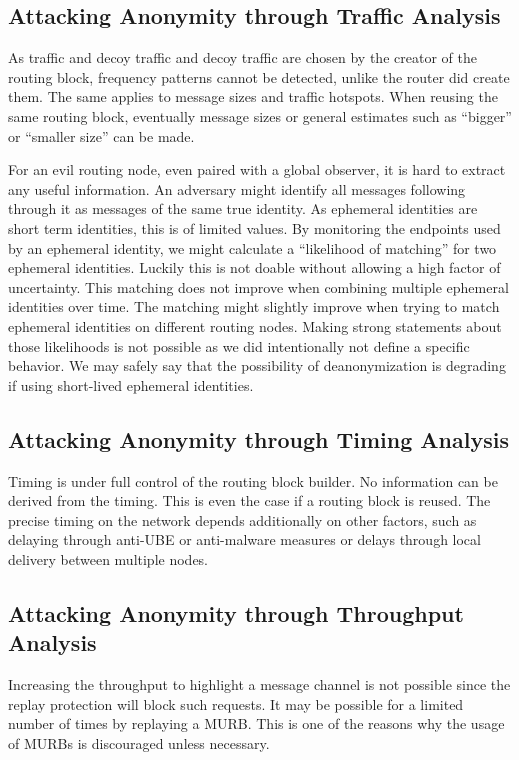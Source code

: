\subsection{Attacking Anonymity through Traffic Analysis}
As traffic and decoy traffic and decoy traffic are chosen by the creator of the routing block, frequency patterns cannot be detected, unlike the router did create them. The same applies to message sizes and traffic hotspots. When reusing the same routing block, eventually message sizes or general estimates such as ``bigger'' or ``smaller size'' can be made.

For an evil routing node, even paired with a global observer, it is hard to extract any useful information. An adversary might identify all messages following through it as messages of the same true identity. As ephemeral identities are short term identities, this is of limited values. By monitoring the endpoints used by an ephemeral identity, we might calculate a ``likelihood of matching'' for two ephemeral identities. Luckily this is not doable without allowing a high factor of uncertainty. This matching does not improve when combining multiple ephemeral identities over time. The matching might slightly improve when trying to match ephemeral identities on different routing nodes. Making strong statements about those likelihoods is not possible as we did intentionally not define a specific behavior. We may safely say that the possibility of deanonymization is degrading if using short-lived ephemeral identities.

\subsection{Attacking Anonymity through Timing Analysis}
Timing is under full control of the routing block builder. No information can be derived from the timing. This is even the case if a routing block is reused. The precise timing on the network depends additionally on other factors, such as delaying through anti-UBE or anti-malware measures or delays through local delivery between multiple nodes.

\subsection{Attacking Anonymity through Throughput Analysis}
Increasing the throughput to highlight a message channel is not possible since the replay protection will block such requests. It may be possible for a limited number of times by replaying a MURB. This is one of the reasons why the usage of MURBs is discouraged unless necessary.

